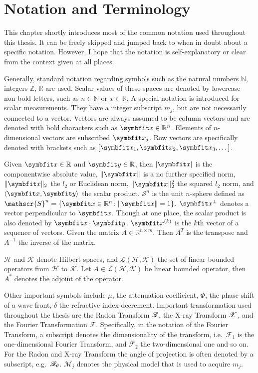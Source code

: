 \chapter{Notation and Terminology}\label{chap:notation}

This chapter shortly introduces most of the common notation used throughout this thesis. It can be
freely skipped and jumped back to when in doubt about a specific notation. However, I hope that the
notation is self-explanatory or clear from the context given at all places.

Generally, standard notation regarding symbols such as the natural numbers \(\mathbb{N}\), integers
\(\mathbb{Z}\), \(\mathbb{R}\) are used. Scalar values of these spaces are denoted by lowercase
non-bold letters, such as \(n \in \mathbb{N}\) or \(x \in \mathbb{R}\). A special notation is
introduced for scalar measurements. They have a integer subscript \(m_j\), but are not necessarily
connected to a vector. Vectors are always assumed to be column vectors and are denoted with bold
characters such as \(\mvec{x} \in \mathbb{R}^n\). Elements of \(n\)-dimensional vectors are
subscribed \(\mvec{x}_j\). Row vectors are specifically denoted with brackets such as \([\mvec{x}_1,
		\mvec{x}_2, \mvec{x}_3, \dots ]\).

Given \(\mvec{x} \in \mathbb{R}\) and \(\mvec{y} \in \mathbb{R}\), then \(\abs{\mvec{x}}\) is the
componentwise absolute value, \(\norm{\mvec{x}}\) is a no further specified norm,
\(\norm{\mvec{x}}_2\) the \(l_2\) or Euclidean norm, \(\norm{\mvec{x}}^2_2\) the squared \(l_2\)
norm, and \(\langle \mvec{x}, \mvec{y} \rangle\) the scalar product. \(\mathscr{S}^n\) is the unit
\(n\)-sphere defined as \(\mathscr{S}^n = \{\mvec{x} \in \mathbb{R}^n \colon \norm{\mvec{x}} = 1 \}\).
\(\mvec{x}^\perp\) denotes a vector perpendicular to \(\mvec{x}\). Though at one place, the scalar
product is also denoted by \(\mvec{x} \cdot \mvec{y}\). \(\mvec{x}^{(k)}\) is the \(k\)th vector of
a sequence of vectors. Given the matrix \(A \in \mathbb{R}^{n \times m}\). Then \(A^T\) is the
transpose and \(A^{-1}\) the inverse of the matrix.

\(\mathcal{H}\) and \(\mathcal{K}\) denote Hilbert spaces, and \(\mathscr{L}(\mathcal{H},
\mathcal{K})\) the set of linear bounded operators from \(\mathcal{H}\) to \(\mathcal{K}\). Let \(A
\in \mathscr{L}(\mathcal{H}, \mathcal{K})\) be linear bounded operator, then \(A^\ast\) denotes the
adjoint of the operator.

Other important symbols include \(\mu\), the attenuation coefficient, \(\Phi\), the phase-shift of a
wave front, \(\delta\) the refractive index decrement. Important transformation used throughout
the thesis are the Radon Transform \(\mathscr{R}\), the X-ray Transform \(\mathscr{X}\), and the Fourier
Transformation \(\mathscr{F}\). Specifically, in the notation of the Fourier Transform, a subscript
denotes the dimensionality of the transform, i.e.\ \(\mathscr{F}_1\) is the one-dimensional Fourier
Transform, and \(\mathscr{F}_2\) the two-dimensional one and so on. For the Radon and X-ray
Transform the angle of projection is often denoted by a subscript, e.g.\ \(\mathscr{R}_\theta\).
\(\mathscr{M}_j\) denotes the physical model that is used to acquire \(m_j\).


